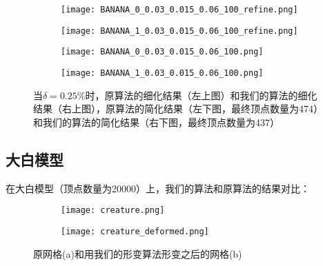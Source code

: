 \begin{figure}[H]
  \centering
  \begin{subfigure}[b]{0.4\textwidth}
    \texttt{[image: BANANA\_0\_0.03\_0.015\_0.06\_100\_refine.png]}
  \end{subfigure}
  \begin{subfigure}[b]{0.4\textwidth}
    \texttt{[image: BANANA\_1\_0.03\_0.015\_0.06\_100\_refine.png]}
  \end{subfigure}
  \begin{subfigure}[b]{0.4\textwidth}
    \texttt{[image: BANANA\_0\_0.03\_0.015\_0.06\_100.png]}
  \end{subfigure}
  \begin{subfigure}[b]{0.4\textwidth}
    \texttt{[image: BANANA\_1\_0.03\_0.015\_0.06\_100.png]}
  \end{subfigure}
  \caption[当$\delta=0.25\%$时banana结果对比]{当$\delta=0.25\%$时，原算法的细化结果（左上图）和我们的算法的细化结果（右上图），原算法的简化结果（左下图，最终顶点数量为474）和我们的算法的简化结果（右下图，最终顶点数量为437）}
  \label{fig:banana-res2}
\end{figure}

\subsection{大白模型}
在大白模型（顶点数量为20000）上，我们的算法和原算法的结果对比：
\begin{figure}[H]
  \centering
  \begin{subfigure}[b]{0.4\textwidth}
    \texttt{[image: creature.png]}
    \end{subfigure}
    \begin{subfigure}[b]{0.4\textwidth}
      \texttt{[image: creature\_deformed.png]}
    \end{subfigure}
    \caption[大白的形变结果]{原网格(a)和用我们的形变算法形变之后的网格(b)}
    \label{fig:creature-deform}
\end{figure}

